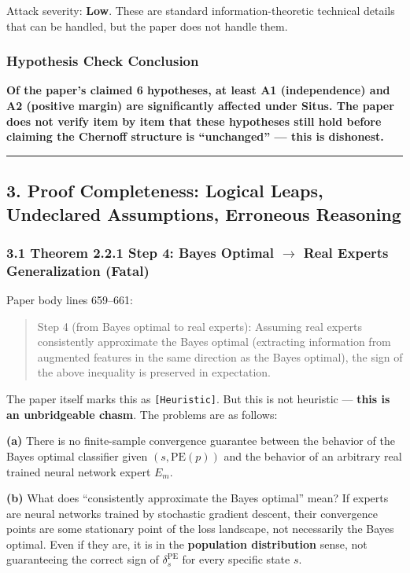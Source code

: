 \documentclass[
  12pt,
]{article}
\begin{document}
Attack severity: \textbf{Low}. These are standard information-theoretic technical details that can be handled, but the paper does not handle them.

\subsubsection{Hypothesis Check Conclusion}\label{hypothesis-check-conclusion}

\textbf{Of the paper's claimed 6 hypotheses, at least A1 (independence) and A2 (positive margin) are significantly affected under Situs. The paper does not verify item by item that these hypotheses still hold before claiming the Chernoff structure is ``unchanged'' --- this is dishonest.}

\begin{center}\rule{0.5\linewidth}{0.5pt}\end{center}

\subsection{3. Proof Completeness: Logical Leaps, Undeclared Assumptions, Erroneous Reasoning}\label{proof-completeness}

\subsubsection{3.1 Theorem 2.2.1 Step 4: Bayes Optimal $\to$ Real Experts Generalization (Fatal)}\label{thm-2.2.1-step4}

Paper body lines 659--661:
\begin{quote}
Step 4 (from Bayes optimal to real experts): Assuming real experts consistently approximate the Bayes optimal (extracting information from augmented features in the same direction as the Bayes optimal), the sign of the above inequality is preserved in expectation.
\end{quote}

The paper itself marks this as \texttt{[Heuristic]}. But this is not heuristic --- \textbf{this is an unbridgeable chasm}. The problems are as follows:

\textbf{(a)} There is no finite-sample convergence guarantee between the behavior of the Bayes optimal classifier given $(s, \text{PE}(p))$ and the behavior of an arbitrary real trained neural network expert $E_m$.

\textbf{(b)} What does ``consistently approximate the Bayes optimal'' mean? If experts are neural networks trained by stochastic gradient descent, their convergence points are some stationary point of the loss landscape, not necessarily the Bayes optimal. Even if they are, it is in the \textbf{population distribution} sense, not guaranteeing the correct sign of $\delta_s^{\text{PE}}$ for every specific state $s$.
\end{document}
